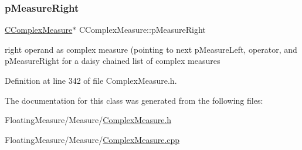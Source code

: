 \subsubsection{\texorpdfstring{p\+Measure\+Right}{pMeasureRight}}
{\footnotesize\ttfamily \hyperlink{classCComplexMeasure}{C\+Complex\+Measure}$\ast$ C\+Complex\+Measure\+::p\+Measure\+Right\hspace{0.3cm}{\ttfamily [protected]}}



right operand as complex measure (pointing to next p\+Measure\+Left, operator, and p\+Measure\+Right for a daisy chained list of complex measures 



Definition at line 342 of file Complex\+Measure.\+h.



The documentation for this class was generated from the following files\+:\begin{DoxyCompactItemize}
\item 
Floating\+Measure/\+Measure/\hyperlink{ComplexMeasure_8h}{Complex\+Measure.\+h}\item 
Floating\+Measure/\+Measure/\hyperlink{ComplexMeasure_8cpp}{Complex\+Measure.\+cpp}\end{DoxyCompactItemize}

